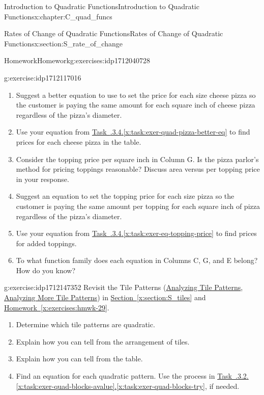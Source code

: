 \documentclass[oneside,10pt,]{book}
\newcommand{\xreffont}{\relax}
\numberwithin{equation}{chapter}
\begin{document}
\begin{chapterptx}{Introduction to Quadratic Functions}{}{Introduction to Quadratic Functions}{}{}{x:chapter:C_quad_funcs}
\begin{sectionptx}{Rates of Change of Quadratic Functions}{}{Rates of Change of Quadratic Functions}{}{}{x:section:S_rate_of_change}
\begin{exercises-subsection}{Homework}{}{Homework}{}{}{g:exercises:idp1712040728}
\begin{divisionexercise}{4}{}{}{g:exercise:idp1712117016}
\begin{enumerate}[font=\bfseries,label=(\alph*),ref=\alph*]
\item\label{x:task:exer-quad-pizza-better-eq}Suggest a better equation to use to set the price for each size cheese pizza so the customer is paying the same amount for each square inch of cheese pizza regardless of the pizza's diameter.%
\item{}Use your equation from \hyperref[x:task:exer-quad-pizza-better-eq]{Task~{\xreffont 4.4.3.4}.{\xreffont\ref{x:task:exer-quad-pizza-better-eq}}} to find prices for each cheese pizza in the table.%
\item{}Consider the topping price per square inch in Column G. Is the pizza parlor's method for pricing toppings reasonable? Discuss area versus per topping price in your response.%
\item\label{x:task:exer-eq-topping-price}Suggest an equation to set the topping price for each size pizza so the customer is paying the same amount per topping for each square inch of pizza regardless of the pizza's diameter.%
\item{}Use your equation from \hyperref[x:task:exer-eq-topping-price]{Task~{\xreffont 4.4.3.4}.{\xreffont\ref{x:task:exer-eq-topping-price}}} to find prices for added toppings.%
\item{}To what function family does each equation in Columns C, G, and E belong? How do you know?%
\end{enumerate}
\end{divisionexercise}%
\begin{divisionexercise}{5}{}{}{g:exercise:idp1712147352}%
Revisit the Tile Patterns (\hyperref[x:worksheet:act-analyze-tiles]{Analyzing Tile Patterns}, \hyperref[x:worksheet:act-analyze-more-tiles]{Analyzing More Tile Patterns}) in \hyperref[x:section:S_tiles]{Section~{\xreffont\ref{x:section:S_tiles}}} and \hyperref[x:exercises:hmwk-29]{Homework~{\xreffont\ref{x:exercises:hmwk-29}}}.%
\begin{enumerate}[font=\bfseries,label=(\alph*),ref=\alph*]
\item{}Determine which tile patterns are quadratic.%
\item{}Explain how you can tell from the arrangement of tiles.%
\item{}Explain how you can tell from the table.%
\item{}Find an equation for each quadratic pattern. Use the process in \hyperref[x:task:exer-quad-blocks-avalue]{Task~{\xreffont 4.4.3.2}.{\xreffont\ref{x:task:exer-quad-blocks-avalue}}\textendash{}{\xreffont 4.4.3.2}.{\xreffont\ref{x:task:exer-quad-blocks-try}}}, if needed.%

\end{enumerate}
\end{divisionexercise}
\end{exercises-subsection}
\end{sectionptx}
\end{chapterptx}
\end{document}
